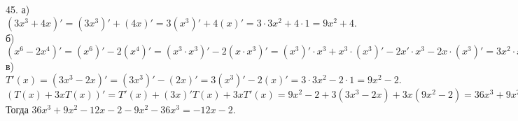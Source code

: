 45. а) $(3x^3+4x)'=(3x^3)'+(4x)'=3(x^3)'+4(x)'=3\cdot3x^2+4\cdot 1=9x^2+4.$\\
б) $(x^6-2x^4)'=(x^6)'-2(x^4)'=(x^3\cdot x^3)'-2(x\cdot x^3)'=(x^3)'\cdot x^3+x^3\cdot (x^3)'-2x' \cdot x^3-2x\cdot (x^3)'=3x^2\cdot x^3+x^3\cdot3x^2-2x^3-2x\cdot3x^2=6x^5-8x^3.$\\
в) $T'(x)=(3x^3-2x)'=(3x^3)'-(2x)'=3(x^3)'-2(x)'=3\cdot3x^2-2\cdot1=9x^2-2.$\\
$(T(x)+3xT(x))'=T'(x)+(3x)'T(x)+3xT'(x)=9x^2-2+3(3x^3-2x)+3x(9x^2-2)=36x^3+9x^2-12x-2.$ Тогда $36x^3+9x^2-12x-2-9x^2-36x^3=-12x-2.$\\
